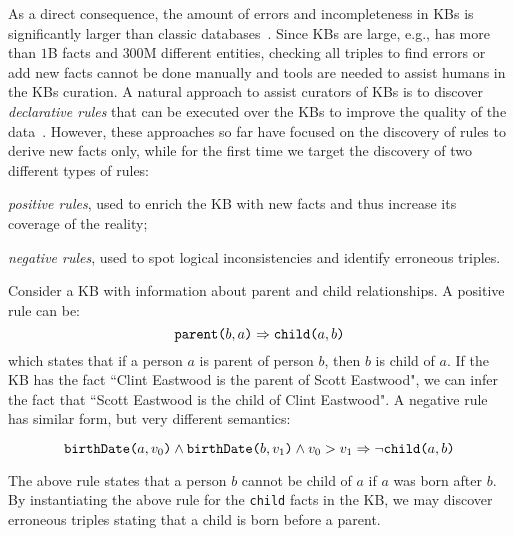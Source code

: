 As a direct consequence, the amount of errors and incompleteness in KBs is significantly larger than classic databases~\cite{suchanek2009sofie}.
Since KBs are large, e.g., \wikidata has more than $1$B facts and $300$M different entities, %
checking all triples to find errors or add new facts cannot be done manually and tools are needed to assist humans in the KBs curation. 
A natural approach to assist curators of KBs is to discover %
\emph{declarative rules} that can be executed over the KBs to improve the quality of the data~\cite{Chen:2016,abedjan2014amending,galarraga2015fast}. However, these approaches so far have focused on the discovery of rules to derive new facts only, while for the first time
we target the discovery %
of two different types of rules:
\begin{inparaenum}[\itshape(i)]
	\item {\em positive rules}, used to enrich the KB with new facts and thus increase its coverage of the reality;
	\item {\em negative rules}, used to spot logical inconsistencies and identify erroneous triples.
\end{inparaenum}

\begin{example}\label{ex:krd_intro}
	Consider a KB with information about parent and child relationships.
	A positive rule can be:
	\begin{equation*}
		\texttt{parent(}b,a\texttt{)} \Rightarrow \texttt{child(}a,b\texttt{)}
	\end{equation*}
	which states that if a person $a$ is parent of person $b$, then $b$ is child of $a$. If the KB has the fact ``Clint Eastwood is the parent of Scott Eastwood", we can infer the fact that ``Scott Eastwood is the child of Clint Eastwood".
	A negative rule has similar form, but very different semantics:
	
	\vspace{-2ex}
	{\small
	\begin{equation*}
		\texttt{birthDate(}a,v_0\texttt{)} \wedge \texttt{birthDate(}b,v_1\texttt{)} \wedge v_0 > v_1 \Rightarrow \neg \texttt{child(}a,b\texttt{)} 
	\end{equation*}
	} 
	\vspace{-2ex}
	
	\noindent The above rule states that a person $b$ cannot be child of $a$ if $a$ was born after $b$. By instantiating the above rule for the \texttt{child} facts in the KB, we may discover erroneous triples stating that a child is born before a parent.
\end{example}

